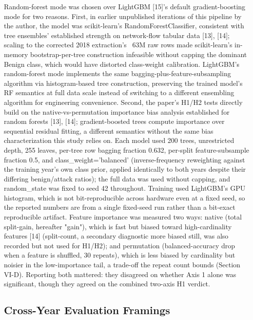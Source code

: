 \documentclass[conference]{IEEEtran}
\begin{document}
Random-forest mode was chosen over LightGBM [15]'s default gradient-boosting mode for two reasons. First, in earlier unpublished iterations of this pipeline by the author, the model was scikit-learn's RandomForestClassifier, consistent with tree ensembles' established strength on network-flow tabular data [13], [14]; scaling to the corrected 2018 extraction's ~63M raw rows made scikit-learn's in-memory bootstrap-per-tree construction infeasible without capping the dominant Benign class, which would have distorted class-weight calibration. LightGBM's random-forest mode implements the same bagging-plus-feature-subsampling algorithm via histogram-based tree construction, preserving the trained model's RF semantics at full data scale instead of switching to a different ensembling algorithm for engineering convenience. Second, the paper's H1/H2 tests directly build on the native-vs-permutation importance bias analysis established for random forests [13], [14]; gradient-boosted trees compute importance over sequential residual fitting, a different semantics without the same bias characterization this study relies on. Each model used 200 trees, unrestricted depth, 255 leaves, per-tree row bagging fraction 0.632, per-split feature-subsample fraction 0.5, and class\_\allowbreak{}weight='balanced' (inverse-frequency reweighting against the training year's own class prior, applied identically to both years despite their differing benign/attack ratios); the full data was used without capping, and random\_\allowbreak{}state was fixed to seed 42 throughout. Training used LightGBM's GPU histogram, which is not bit-reproducible across hardware even at a fixed seed, so the reported numbers are from a single fixed-seed run rather than a bit-exact reproducible artifact. Feature importance was measured two ways: native (total split-gain, hereafter "gain"), which is fast but biased toward high-cardinality features [14] (split-count, a secondary diagnostic more biased still, was also recorded but not used for H1/H2); and permutation (balanced-accuracy drop when a feature is shuffled, 30 repeats), which is less biased by cardinality but noisier in the low-importance tail, a trade-off the repeat count bounds (Section VI-D). Reporting both mattered: they disagreed on whether Axis 1 alone was significant, though they agreed on the combined two-axis H1 verdict.
\par\medskip

\subsection{Cross-Year Evaluation Framings}
\end{document}
